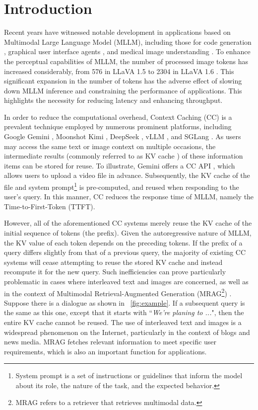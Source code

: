 \section{Introduction}

Recent years have witnessed notable development in applications based on Multimodal Large Language Model (MLLM), including those for code generation \cite{zhu2023minigpt4}, graphical user interface agents \cite{hong_2024_CVPR, zhang2023appagent}, and medical image understanding \cite{li2023, zhang2023pmcvqa}. To enhance the perceptual capabilities of MLLM, the number of processed image tokens has increased considerably, from 576 in LLaVA 1.5 \cite{liu_2024_CVPR} to 2304 in LLaVA 1.6 \cite{liu2024llavanext}. This significant expansion in the number of tokens has the adverse effect of slowing down MLLM inference and constraining the performance of applications. This highlights the necessity for reducing latency and enhancing throughput.

In order to reduce the computational overhead, Context Caching (CC) is a prevalent technique employed by numerous prominent platforms, including Google Gemini \cite{gemini}, Moonshot Kimi \cite{kimi_api}, DeepSeek \cite{deepseek_api}, vLLM \cite{kwon2023efficient}, and SGLang \cite{zheng2024sglang}. As users may access the same text or image context on multiple occasions, the intermediate results (commonly referred to as KV cache \cite{pope2023}) of these information items can be stored for reuse. To illustrate, Gemini offers a CC API \cite{gemini}, which allows users to upload a video file in advance. Subsequently, the KV cache of the file and system prompt\footnote{System prompt is a set of instructions or guidelines that inform the model about its role, the nature of the task, and the expected behavior.} is pre-computed, and reused when responding to the user's query. In this manner, CC reduces the response time of MLLM, namely the Time-to-First-Token (TTFT).

However, all of the aforementioned CC systems merely reuse the KV cache of the initial sequence of tokens (the prefix). Given the autoregressive nature of MLLM, the KV value of each token depends on the preceding tokens. If the prefix of a query differs slightly from that of a previous query, the majority of existing CC systems will cease attempting to reuse the stored KV cache and instead recompute it for the new query. Such inefficiencies can prove particularly problematic in cases where interleaved text and images \cite{huang2024sparkles} are concerned, as well as in the context of Multimodal Retrieval-Augmented Generation (MRAG\footnote{MRAG refers to a retriever that retrieves multimodal data.}) \cite{wei2024uniir}. Suppose there is a dialogue as shown in \figurename~\ref{fig:example}. If a subsequent query is the same as this one, except that it starts with ``\textit{We're planing to ...}", then the entire KV cache cannot be reused. The use of interleaved text and images is a widespread phenomenon on the Internet, particularly in the context of blogs and news media. MRAG fetches relevant information to meet specific user requirements, which is also an important function for applications.

